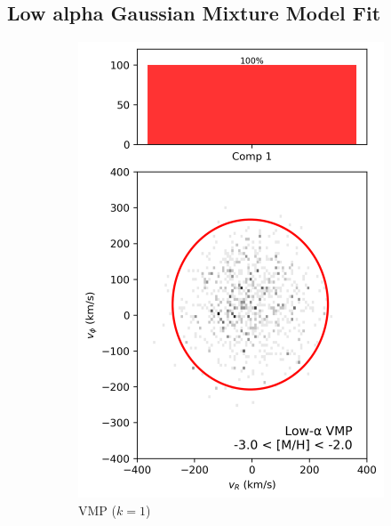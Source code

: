 \documentclass[a4paper,12pt]{article}
\begin{document}
\subsection{Low alpha Gaussian Mixture Model Fit}

\begin{figure}[H]
  \centering
  \begin{subfigure}{0.24\linewidth}
    \centering
    \includegraphics[width=\linewidth]{../figures/gmm_vmp_low_alpha_k1.png}
    \caption{VMP ($k{=}1$)}
    \label{fig:gmm_vmp_lo}
  \end{subfigure}\hfill
  \begin{subfigure}{0.24\linewidth}
    \centering

\end{subfigure}
\end{figure}
\end{document}
